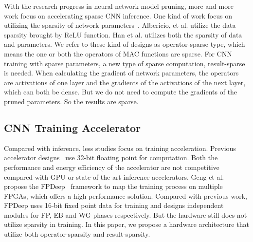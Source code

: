 With the research progress in neural network model pruning, more and more work focus on accelerating sparse CNN inference. One kind of work focus on utilizing the sparsity of network parameters~\cite{han2017ese,zhang2016cambricon}. Albericio, et al.\cite{albericio2016cnvlutin} utilize the data sparsity brought by ReLU function. Han et al. \cite{han2016eie} utilizes both the sparsity of data and parameters. We refer to these kind of designs as operator-sparse type, which means the one or both the operators of MAC functions are sparse. For CNN training with sparse parameters, a new type of sparse computation, result-sparse is needed. When calculating the gradient of network parameters, the operators are activations of one layer and the gradients of the activations of the next layer, which can both be dense. But we do not need to compute the gradients of the pruned parameters. So the results are sparse.

\subsection{CNN Training Accelerator}\label{sec:rw:train_acc}
Compared with inference, less studies focus on training acceleration. Previous accelerator designs~\cite{liu2017fpga, zhao2016f} use 32-bit floating point for computation. Both the performance and energy efficiency of the accelerator are not competitive compared with GPU or state-of-the-art inference accelerators. Geng et al. propose the FPDeep~\cite{geng2018fpdeep} framework to map the training process on multiple FPGAs, which offers a high performance solution. Compared with previous work, FPDeep uses 16-bit fixed point data for training and designs independent modules for FP, EB and WG phases respectively. But the hardware still does not utilize sparsity in training. In this paper, we propose a hardware architecture that utilize both operator-sparsity and result-sparsity.

